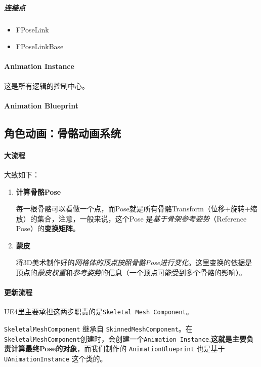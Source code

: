 \documentclass[UTF8,a4paper,12pt]{ctexbook}
\begin{document}
				
				\subparagraph{连接点}
					\begin{itemize}
						\item FPoseLink
						\item FPoseLinkBase
					\end{itemize}
					
						
						
			
			
			\paragraph{Animation Instance}
				这是所有逻辑的控制中心。
			
			
			
			\paragraph{Animation Blueprint}
			
			
			
			
		\subsection{角色动画：骨骼动画系统}
			
			\paragraph{大流程}
				大致如下：
				
				\begin{enumerate}
					\item \textbf{计算骨骼Pose}
						
						每一根骨骼可以看做一个点，而Pose就是所有骨骼Transform（位移+旋转+缩放）的集合，注意，一般来说，这个Pose 是\textit{基于骨架参考姿势}（Reference Pose）的\textbf{变换矩阵}。
					\item \textbf{蒙皮}
					
						将3D美术制作好的\textit{网格体的顶点按照骨骼Pose进行变化}。这里变换的依据是顶点的\textit{蒙皮权重}和\textit{参考姿势}的信息（一个顶点可能受到多个骨骼的影响）。
				\end{enumerate}
				
			\paragraph{更新流程}
				UE4里主要承担这两步职责的是\verb|Skeletal Mesh Component|。
				
				\verb|SkeletalMeshComponent| 继承自 \verb|SkinnedMeshComponent|。在\verb|SkeletalMeshComponent|创建时，会创建一个\verb|Animation Instance|,\textbf{这就是主要负责计算最终Pose的对象}，而我们制作的 \verb|AnimationBlueprint| 也是基于 \verb|UAnimationInstance| 这个类的。
				
\end{document}
